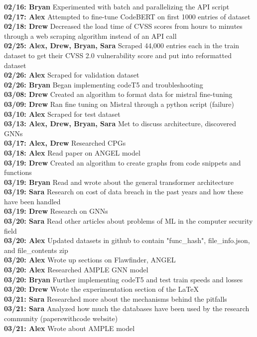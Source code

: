 \documentclass{article}
\begin{document}
\textbf{02/16: Bryan} Experimented with batch and parallelizing the API script \\
\textbf{02/17: Alex} Attempted to fine-tune CodeBERT on first 1000 entries of dataset \\
\textbf{02/18: Drew} Decreased the load time of CVSS scores from hours to minutes through a web scraping algorithm instead of an API call \\
\textbf{02/25: Alex, Drew, Bryan, Sara} Scraped 44,000 entries each in the train dataset to get their CVSS 2.0 vulnerability score and put into reformatted dataset \\
\textbf{02/26: Alex} Scraped for validation dataset \\
\textbf{02/26: Bryan} Began implementing codeT5 and troubleshooting \\
\textbf{03/08: Drew} Created an algorithm to format data for mistral fine-tuning \\
\textbf{03/09: Drew} Ran fine tuning on Mistral through a python script (failure) \\
\textbf{03/10: Alex} Scraped for test dataset \\
\textbf{03/13: Alex, Drew, Bryan, Sara} Met to discuss architecture, discovered GNNs \\
\textbf{03/17: Alex, Drew} Researched CPGs \\
\textbf{03/18: Alex} Read paper on ANGEL model \\
\textbf{03/19: Drew} Created an algorithm to create graphs from code snippets and functions \\
\textbf{03/19: Bryan} Read and wrote about the general transformer architecture \\
\textbf{03/19: Sara} Research on cost of data breach in the past years and how these have been handled \\
\textbf{03/19: Drew} Research on GNNs \\
\textbf{03/20: Sara} Read other articles about problems of ML in the computer security field \\
\textbf{03/20: Alex} Updated datasets in github to contain "func\_hash", file\_info.json, and file\_contents zip \\
\textbf{03/20: Alex} Wrote up sections on Flawfinder, ANGEL \\
\textbf{03/20: Alex} Researched AMPLE GNN model \\
\textbf{03/20: Bryan} Further implementing codeT5 and test train speeds and losses \\
\textbf{03/20: Drew} Wrote the experimentation section of the LaTeX \\
\textbf{03/21: Sara} Researched more about the mechanisms behind the pitfalls \\
\textbf{03/21: Sara} Analyzed how much the databases have been used by the research community (paperswithcode website) \\
\textbf{03/21: Alex} Wrote about AMPLE model \\

\nocite{*}

\end{document}
